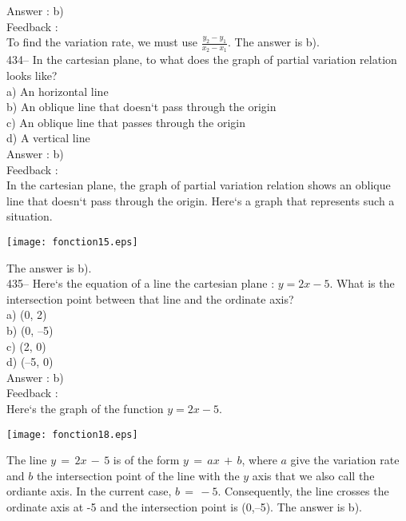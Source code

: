 \documentclass[letterpaper, 12pt]{article}
\begin{document}
Answer :  b)\\

Feedback : \\
To find the variation rate, we must use
$\frac{y_2-y_1}{x_2-x_1}$.  The answer is b).\\

434--  In the cartesian plane, to what does the graph of partial variation relation looks like?\\
a) An horizontal line\\
b) An oblique line that doesn`t pass through the origin\\
c) An oblique line that passes through the origin\\
d) A vertical line\\

Answer :  b)\\

Feedback : \\
In the cartesian plane, the graph of partial variation relation shows an oblique line that doesn`t pass through the origin. Here`s a graph that represents such a situation.\\
    \begin{center}
    \texttt{[image: fonction15.eps]}
    \end{center}

The answer is b).\\

435-- Here`s the equation of a line the cartesian plane : $y=2x-5$.
What is the intersection point between that line and the ordinate axis?\\
a) (0, 2)\\
b) (0, --5)\\
c) (2, 0)\\
d) (--5, 0)\\

Answer :  b)\\

Feedback : \\
Here`s the graph of the function $y=2x-5$.\\
    \begin{center}
    \texttt{[image: fonction18.eps]}
    \end{center}

The line $y\,=\,2x\,-\,5$ is of the form $y\,=\,ax\,+\,b$, where
$a$ give the variation rate and $b$ the intersection point of the line with the $y$ axis that we also call the ordiante axis.
In the current case, $b\,=\,-5$. Consequently, the line crosses the ordinate axis at -5 and the intersection point is (0,--5).
The answer is b).\\
\end{document}
